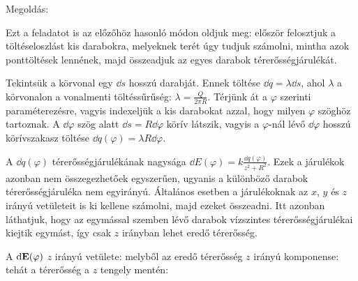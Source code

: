 
\ifdefined\megoldas

 Megoldás: 


 Ezt a feladatot is az előzőhöz hasonló módon oldjuk meg: először felosztjuk a töltéseloszlást kis darabokra, melyeknek terét úgy tudjuk számolni, mintha azok ponttöltések lennének, majd összeadjuk az egyes darabok térerősségjárulékát. 

 Tekintsük a körvonal egy $\dd s$ hosszú darabját. Ennek töltése $\dd q=\lambda\dd s$, ahol $\lambda$ a körvonalon a vonalmenti töltéssűrűség: $\lambda=\frac{Q}{2\pi R}$. Térjünk át a $\varphi$ szerinti paraméterezésre, vagyis indexeljük a kis darabokat azzal, hogy milyen $\varphi$ szöghöz tartoznak. A $\dd\varphi$ szög alatt $\dd s = R\dd\varphi$ körív látszik, vagyis a $\varphi$-nál lévő $\dd\varphi$ hosszú körívszakasz töltése $\dd q(\varphi)=\lambda R \dd\varphi$.

 A $\dd q(\varphi)$ térerősségjárulékának nagysága $\dd E(\varphi)=k\frac{\dd q(\varphi)}{z^2+R^2}$. Ezek a járulékok azonban nem összegezhetőek egyszerűen, ugyanis a különböző darabok térerősségjáruléka nem egyirányú. Általános esetben a járulékoknak az $x$, $y$ és $z$ irányú vetületeit is ki kellene számolni, majd ezeket összeadni. Itt azonban láthatjuk, hogy az egymással szemben lévő darabok vízszintes térerősségjárulékai kiejtik egymást, így csak $z$ irányban lehet eredő térerősség. 

 A $\mathrm{d} \mathbf{E}(\varphi)$ $z$ irányú vetülete: 
 melyből az eredő térerősség $z$ irányú komponense:
 tehát a térerősség a $z$ tengely mentén:
 
\fi